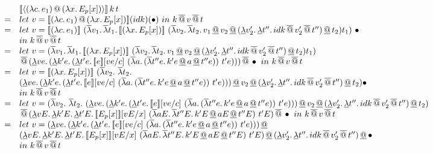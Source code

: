 \begin{figure}
\[
\begin{array}{cl}
 & \CPSTh{\Prompt{\App{\LamP{c}{e_1}}{\LamP{x}{E_p[x]}}}}\,k\,t\\
 = & let\ v = \CPSTh{\App{\LamP{c}{e_1}}{\LamP{x}{E_p[x]}}}(idk)(\bullet)\ in\ 
  k\SAppS v \SAppS t\\
  = & let\ v = \CPSTh{\LamP{c}{e_1}}\ \SLamP{v_1}{
    \SLam{t_1}{\CPSTh{\LamP{x}{E_p[x]}}\ \SLamP{v_2}{
        \SLam{t_2}{\DApp{\DApp{\DApp{v_1}{v_2}}
                    {\DLamP{v_2'}{\DLam{t''}
                        {\SApp{\SApp{idk}{v_2'}}{t''}}}}}{t_2}}}}t_1} \ \bullet\ \\
  & in\ k\SAppS v \SAppS t\\
  = & let\ v = \SLamP{v_1}{
    \SLam{t_1}{\CPSTh{\LamP{x}{E_p[x]}}\ \SLamP{v_2}{
        \SLam{t_2}{\DApp{\DApp{\DApp{v_1}{v_2}}
                    {\DLamP{v_2'}{\DLam{t''}
                        {\SApp{\SApp{idk}{v_2'}}{t''}}}}}{t_2}}}}t_1} \\
  & \SAppS
  \DLamP{ve}{\DLamP{k'e}{\DLamP{t'e}{\CPSTh{e}[\Change{c}{ve}]\
        \SLamP{a}{\SLamP{t''e}{k'e \DAppS a \DAppS t''e}}\ t'e}}} \SAppS \bullet\ in\
  k\SAppS v \SAppS t\\

  = & let\ v = \CPSTh{\LamP{x}{E_p[x]}}\ (\SLamS v_2.\ 
  \SLamS t_2.\ \\
   & \DApp{\DApp{\DApp{\DLamP{ve}{\DLamP{k'e}{\DLamP{t'e}{\CPSTh{e}[\Change{c}{ve}]\
        \SLamP{a}{\SLamP{t''e}{k'e \DAppS a \DAppS t''e}}\ t'e}}}}{v_2}}
                    {\DLamP{v_2'}{\DLam{t''}
                        {\SApp{\SApp{idk}{v_2'}}{t''}}}}}{t_2})\bullet\\
  & in\ k\SAppS v \SAppS t\\

  = & let\ v = (\SLamS v_2.\ 
  \SLamS t_2.\ 
  \DApp{\DApp{\DApp{\DLamP{ve}{\DLamP{k'e}{\DLamP{t'e}{\CPSTh{e}[\Change{c}{ve}]\
        \SLamP{a}{\SLamP{t''e}{k'e \DAppS a \DAppS t''e}}\ t'e}}}}{v_2}}
                    {\DLamP{v_2'}{\DLam{t''}
                        {\SApp{\SApp{idk}{v_2'}}{t''}}}}}{t_2})\\
  & \SAppS \DLamP{vE}{\DLam{k'E}{\DLam{t'E}{\CPSTh{E_p[x]}[\Change{x}{vE}]\
  \SLamP{aE}{\SLam{t''E}{k'E \DAppS aE \DAppS t''E}}\ t'E}}} \SAppS \bullet \ in\
  k\SAppS v \SAppS t\\

  = & let\ v =  \DLamP{ve}{\DLamP{k'e}{\DLamP{t'e}{\CPSTh{e}[\Change{c}{ve}]\
              \SLamP{a}{\SLamP{t''e}{k'e \DAppS a \DAppS t''e}}\ t'e}}}\DAppS\\
      & \DLamP{vE}{\DLam{k'E}{\DLam{t'E}{\CPSTh{E_p[x]}[\Change{x}{vE}]\
              \SLamP{aE}{\SLam{t''E}{k'E \DAppS aE \DAppS t''E}}\ t'E}}} \DAppS
                    \DLamP{v_2'}{\DLam{t''}
                      {\SApp{\SApp{idk}{v_2'}}{t''}}}\DAppS{\bullet}\\
                    & in\ k\SAppS v \SAppS t\\


\end{array}\]
\end{figure}
